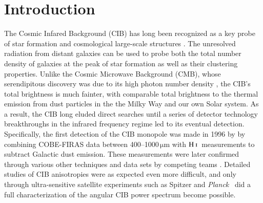 \documentclass{aa}
\def\Planck{\textit{Planck}}
\newcommand{\mathsc}[1]{{\normalfont\textsc{#1}}}
\newcommand{\hi}{\ensuremath{\mathsc {H\ i}}}
\begin{document}

   \maketitle

   \setcounter{tocdepth}{2}
   \tableofcontents


\section{Introduction}

The Cosmic Infared Background (CIB) has long been recognized as a key probe of star formation and cosmological large-scale structures \citep{partridge1967}. The unresolved radiation from distant galaxies can be used to probe both the total number density of galaxies at the peak of star formation as well as their clustering properties. Unlike the Cosmic Microwave Background (CMB), whose serendipitous discovery was due to its high photon number density \citep{penzias:1965}, the CIB's total brightness is much fainter, with comparable total brightness to the thermal emission from dust particles in the the Milky Way and our own Solar system. As a result, the CIB long eluded direct searches until a series of detector technology breakthroughs in the infrared frequency regime led to its eventual detection. Specifically, the first detection of the CIB monopole was made in 1996 by \citet{puget1996} by combining COBE-FIRAS data between 400--1000\,$\mathrm{\mu m}$ with \hi\ measurements to subtract Galactic dust emission. These measurements were later confirmed through various other techniques and data sets by competing teams \citep[e.g.,][]{fixsen1998, schlegel1998, lagache:1999, penin:2012}. Detailed studies of CIB anisotropies were as expected even more difficult, and only through ultra-sensitive satellite experiments such as Spitzer and \Planck\ \citep{dole:2006,planck2013-pip56, planck2016-XLVIII, lenz:2019, odegard:2019} did a full characterization of the angular CIB power spectrum become possible. 
\end{document}
